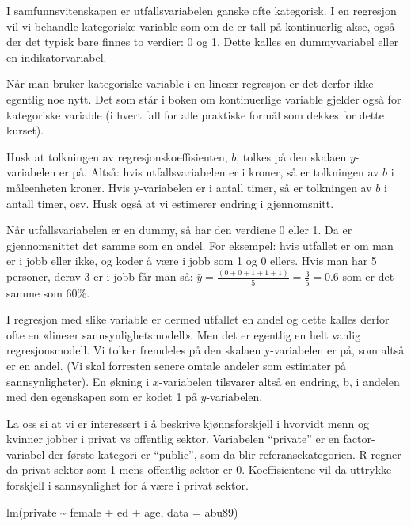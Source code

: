 \documentclass[
  norsk,
  letterpaper,
  DIV=11,
  numbers=noendperiod]{scrreprt}
\newenvironment{Shaded}{\begin{snugshade}}{\end{snugshade}}
\newcommand{\AttributeTok}[1]{\textcolor[rgb]{0.40,0.45,0.13}{#1}}
\newcommand{\FunctionTok}[1]{\textcolor[rgb]{0.28,0.35,0.67}{#1}}
\newcommand{\NormalTok}[1]{\textcolor[rgb]{0.00,0.23,0.31}{#1}}
\newcommand{\SpecialCharTok}[1]{\textcolor[rgb]{0.37,0.37,0.37}{#1}}
\theoremstyle{definition}
\theoremstyle{remark}
\begin{document}
I samfunnsvitenskapen er utfallsvariabelen ganske ofte kategorisk. I en
regresjon vil vi behandle kategoriske variable som om de er tall på
kontinuerlig akse, også der det typisk bare finnes to verdier: 0 og 1.
Dette kalles en dummyvariabel eller en indikatorvariabel.

Når man bruker kategoriske variable i en lineær regresjon er det derfor
ikke egentlig noe nytt. Det som står i boken om kontinuerlige variable
gjelder også for kategoriske variable (i hvert fall for alle praktiske
formål som dekkes for dette kurset).

Husk at tolkningen av regresjonskoeffisienten, \(b\), tolkes på den
skalaen \(y\)-variabelen er på. Altså: hvis utfallsvariabelen er i
kroner, så er tolkningen av \(b\) i måleenheten kroner. Hvis
y-variabelen er i antall timer, så er tolkningen av \(b\) i antall
timer, osv. Husk også at vi estimerer endring i gjennomsnitt.

Når utfallsvariabelen er en dummy, så har den verdiene 0 eller 1. Da er
gjennomsnittet det samme som en andel. For eksempel: hvis utfallet er om
man er i jobb eller ikke, og koder å være i jobb som 1 og 0 ellers. Hvis
man har 5 personer, derav 3 er i jobb får man så:
\(\bar{y} = \frac{(0+0+1+1+1)} {5} = \frac{3}{5}=0.6\) som er det samme
som 60\%.

I regresjon med slike variable er dermed utfallet en andel og dette
kalles derfor ofte en «lineær sannsynlighetsmodell». Men det er egentlig
en helt vanlig regresjonsmodell. Vi tolker fremdeles på den skalaen
y-variabelen er på, som altså er en andel. (Vi skal forresten senere
omtale andeler som estimater på sannsynligheter). En økning i
\(x\)-variabelen tilsvarer altså en endring, b, i andelen med den
egenskapen som er kodet 1 på \(y\)-variabelen.

La oss si at vi er interessert i å beskrive kjønnsforskjell i hvorvidt
menn og kvinner jobber i privat vs offentlig sektor. Variabelen
``private'' er en factor-variabel der første kategori er ``public'', som
da blir referansekategorien. R regner da privat sektor som 1 mens
offentlig sektor er 0. Koeffisientene vil da uttrykke forskjell i
sannsynlighet for å være i privat sektor.

\begin{Shaded}
\begin{Highlighting}[]
\FunctionTok{lm}\NormalTok{(private }\SpecialCharTok{\textasciitilde{}}\NormalTok{ female }\SpecialCharTok{+}\NormalTok{ ed }\SpecialCharTok{+}\NormalTok{ age, }\AttributeTok{data =}\NormalTok{ abu89)}
\end{Highlighting}
\end{Shaded}
\end{document}
